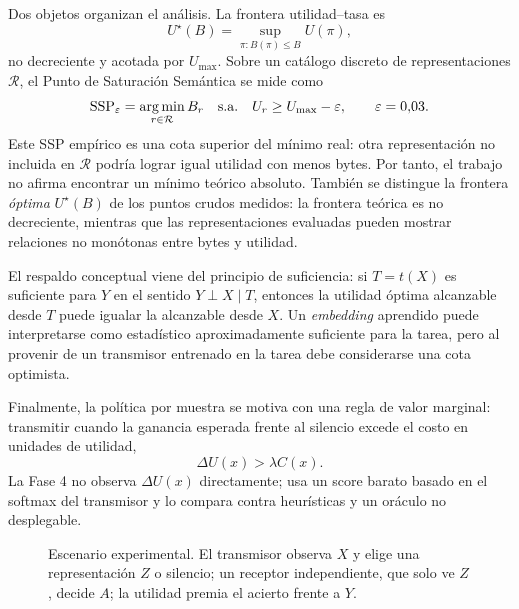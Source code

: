 Dos objetos organizan el an\'alisis. La frontera utilidad--tasa es
\begin{equation}
U^\star(B)=\sup_{\pi:B(\pi)\le B} U(\pi),
\end{equation}
no decreciente y acotada por $U_{\max}$. Sobre un cat\'alogo discreto de representaciones $\mathcal R$, el Punto de Saturaci\'on Sem\'antica se mide como
\begin{equation}
\mathrm{SSP}_{\varepsilon}=\operatorname*{arg\,min}_{r\in\mathcal R} B_r
\quad\text{s.a.}\quad U_r\ge U_{\max}-\varepsilon,
\qquad \varepsilon=0{,}03.
\end{equation}
Este SSP emp\'irico es una cota superior del m\'inimo real: otra representaci\'on no incluida en $\mathcal R$ podr\'ia lograr igual utilidad con menos bytes. Por tanto, el trabajo no afirma encontrar un m\'inimo te\'orico absoluto. Tambi\'en se distingue la frontera \emph{\'optima} $U^\star(B)$ de los puntos crudos medidos: la frontera te\'orica es no decreciente, mientras que las representaciones evaluadas pueden mostrar relaciones no mon\'otonas entre bytes y utilidad.

El respaldo conceptual viene del principio de suficiencia: si $T=t(X)$ es suficiente para $Y$ en el sentido $Y\perp X\mid T$, entonces la utilidad \'optima alcanzable desde $T$ puede igualar la alcanzable desde $X$. Un \emph{embedding} aprendido puede interpretarse como estad\'istico aproximadamente suficiente para la tarea, pero al provenir de un transmisor entrenado en la tarea debe considerarse una cota optimista.

Finalmente, la pol\'itica por muestra se motiva con una regla de valor marginal: transmitir cuando la ganancia esperada frente al silencio excede el costo en unidades de utilidad,
\begin{equation}
\Delta U(x)>\lambda C(x).
\end{equation}
La Fase 4 no observa $\Delta U(x)$ directamente; usa un score barato basado en el softmax del transmisor y lo compara contra heur\'isticas y un or\'aculo no desplegable.

\begin{figure}[t]
\centering
{}
\caption{Escenario experimental. El transmisor observa $X$ y elige una representaci\'on $Z$ o silencio; un receptor independiente, que solo ve $Z$, decide $A$; la utilidad premia el acierto frente a $Y$.}
\end{figure}


